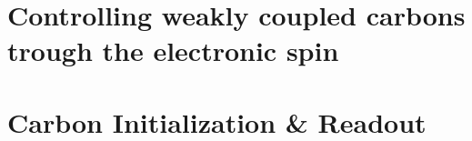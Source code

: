\section{Controlling weakly coupled carbons trough the electronic spin}

\section{Carbon Initialization \& Readout}



